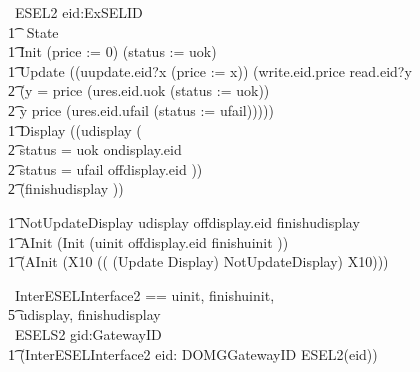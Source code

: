 %
\begin{circus}
	\circprocess\ ESEL2 \circdef eid:ExSELID \circspot \circbegin \\

    	\t1 \circstate\ State  \\

    	\t1	Init \circdef (price := 0) \circseq (status := uok) \\

        \t1 Update \circdef ((uupdate.eid?x \then (price := x)) \circseq (write.eid.price \then read.eid?y \\
            \t2 \then (\lcircguard y = price \rcircguard \circguard (ures.eid.uok \then (status := uok)) \\
            \t2  \extchoice \lcircguard y \neq price \rcircguard \circguard (ures.eid.ufail \then (status := ufail))))) \\

        \t1 Display \circdef ((udisplay \then (\\
            \t2  \lcircguard status = uok \rcircguard \circguard ondisplay.eid \then \Skip \\
            \t2 \extchoice \lcircguard status = ufail \rcircguard \circguard offdisplay.eid \then \Skip)) \\
            \t2 \circseq (finishudisplay \then \Skip))

        \t1 NotUpdateDisplay \circdef udisplay \then offdisplay.eid \then finishudisplay \then \Skip \\

        \t1 AInit \circdef  (Init \circseq (uinit \then offdisplay.eid \then finishuinit \then \Skip))\\

	    \t1 \circspot (AInit \circseq (\circmu X10 \circspot (( (Update \circseq Display) \extchoice NotUpdateDisplay) \circseq X10))) \\
	\circend
\end{circus}

\begin{circus}
    \circchannelset\ InterESELInterface2 == \lchanset uinit, finishuinit, \\
                \t5 udisplay, finishudisplay \rchanset \\
    \circprocess\ ESELS2 \circdef gid:GatewayID \circspot \\
        \t1 (\lpar InterESELInterface2 \rpar eid: DOMGGatewayID  \circspot ESEL2(eid)) \\
\end{circus}

